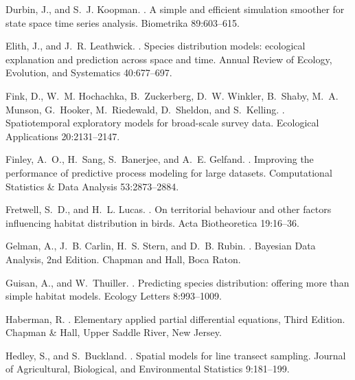 \documentclass[12pt,english]{article}
\begin{document}
\begin{spacing}{1.9}
\begin{thebibliography}{59}
Durbin, J., and S.~J. Koopman.
.
\newblock A simple and efficient simulation smoother for state space time
  series analysis.
\newblock Biometrika { 89}:603--615.

Elith, J., and J.~R. Leathwick.
.
\newblock Species distribution models: ecological explanation and prediction
  across space and time.
\newblock Annual Review of Ecology, Evolution, and Systematics {
  40}:677--697.

Fink, D., W.~M. Hochachka, B.~Zuckerberg, D.~W. Winkler, B.~Shaby, M.~A.
  Munson, G.~Hooker, M.~Riedewald, D.~Sheldon, and S.~Kelling.
.
\newblock Spatiotemporal exploratory models for broad-scale survey data.
\newblock Ecological Applications { 20}:2131--2147.

Finley, A.~O., H.~Sang, S.~Banerjee, and A.~E. Gelfand.
.
\newblock Improving the performance of predictive process modeling for large
  datasets.
\newblock Computational Statistics \& Data Analysis { 53}:2873--2884.

Fretwell, S.~D., and H.~L. Lucas.
.
\newblock On territorial behaviour and other factors influencing habitat
  distribution in birds.
\newblock Acta Biotheoretica { 19}:16--36.

Gelman, A., J.~B. Carlin, H.~S. Stern, and D.~B. Rubin.
.
\newblock Bayesian Data Analysis, 2nd Edition.
\newblock Chapman and Hall, Boca Raton.

Guisan, A., and W.~Thuiller.
.
\newblock Predicting species distribution: offering more than simple habitat
  models.
\newblock Ecology Letters { 8}:993--1009.

Haberman, R.
.
\newblock Elementary applied partial differential equations, Third Edition.
\newblock Chapman \& Hall, Upper Saddle River, New Jersey.

Hedley, S., and S.~Buckland.
.
\newblock Spatial models for line transect sampling.
\newblock Journal of Agricultural, Biological, and Environmental Statistics
  { 9}:181--199.


\end{thebibliography}
\end{spacing}
\end{document}
